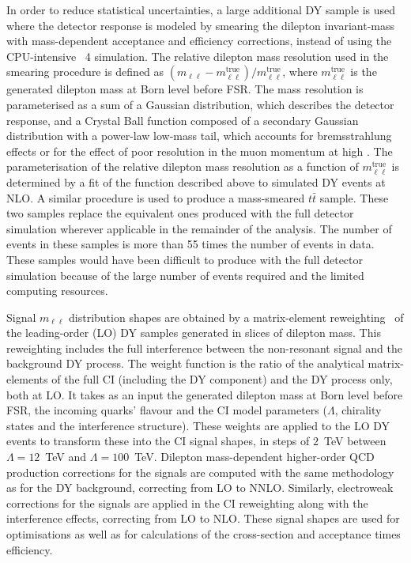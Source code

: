 In order to reduce statistical uncertainties, a large additional DY sample is used where the detector response is modeled by smearing the dilepton invariant-mass with mass-dependent acceptance and efficiency corrections, instead of using the CPU-intensive \GEANT~4 simulation.
The relative dilepton mass resolution used in the smearing procedure is defined as $(m_{\ell\ell}-m_{\ell\ell}^\mathrm{true})/m_{\ell\ell}^\mathrm{true}$, where $m_{\ell\ell}^\mathrm{true}$ is the generated dilepton mass at Born level before FSR.
The mass resolution is parameterised as a sum of a Gaussian distribution, which describes the detector response, and a Crystal Ball function composed of a secondary Gaussian distribution with a power-law low-mass tail,
which accounts for bremsstrahlung effects or for the effect of poor resolution in the muon momentum at high \pt.
The parameterisation of the relative dilepton mass resolution as a function of $m_{\ell\ell}^\mathrm{true}$ is determined by a fit of the function described above to simulated DY events at NLO.
A similar procedure is used to produce a mass-smeared $t\bar{t}$ sample.
These two samples replace the equivalent ones produced with the full detector simulation wherever applicable in the remainder of the analysis.
The number of events in these samples is more than 55 times the number of events in data.
These samples would have been difficult to produce with the full detector simulation because of the large number of events required and the limited computing resources.

Signal $m_{\ell\ell}$ distribution shapes are obtained by a matrix-element reweighting~\cite{EXOT-2016-05} of the leading-order (LO) DY samples generated in slices of dilepton mass.
This reweighting includes the full interference between the non-resonant signal and the background DY process.
The weight function is the ratio of the analytical matrix-elements of the full CI (including the DY component) and the DY process only, both at LO.
It takes as an input the generated dilepton mass at Born level before FSR, the incoming quarks' flavour and the CI model parameters ($\Lambda$, chirality states and the interference structure).
These weights are applied to the LO DY events to transform these into the CI signal shapes, in steps of $2$~TeV between $\Lambda=12$~TeV and $\Lambda=100$~TeV.
Dilepton mass-dependent higher-order QCD production corrections for the signals are computed with the same methodology as for the DY background, correcting from LO to NNLO.
Similarly, electroweak corrections for the signals are applied in the CI reweighting along with the interference effects, correcting from LO to NLO.
These signal shapes are used for optimisations as well as for calculations of the cross-section and acceptance times efficiency.

